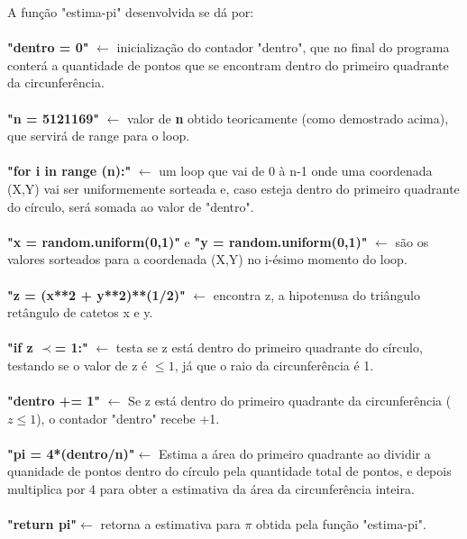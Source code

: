\documentclass{article}
\begin{document}
    A função "estima-pi" desenvolvida se dá por:\\
    \\
    \textbf{"dentro = 0"} $\leftarrow$ inicialização do contador "dentro", que no final do programa conterá a quantidade de pontos que se encontram dentro do primeiro quadrante da circunferência.\\
    \\
    \textbf{"n = 5121169"} $\leftarrow$ valor de \textbf{n} obtido teoricamente (como demostrado acima), que servirá de range para o loop.\\
    \\
    \textbf{"for i in range (n):"} $\leftarrow$ um loop que vai de 0 à n-1 onde uma coordenada (X,Y) vai ser uniformemente sorteada e, caso esteja dentro do primeiro quadrante do círculo, será somada ao valor de "dentro".\\
    \\
    \textbf{"x = random.uniform(0,1)"} e \textbf{"y = random.uniform(0,1)"} $\leftarrow$ são os valores sorteados para a coordenada (X,Y) no i-ésimo momento do loop.\\
    \\
    \textbf{"z = (x**2 + y**2)**(1/2)"} $\leftarrow$ encontra z, a hipotenusa do triângulo retângulo de catetos x e y.\\
    \\
    \textbf{"if z $\prec$= 1:"} $ \leftarrow$ testa se z está dentro do primeiro quadrante do círculo, testando se o valor de z é $\leq 1$, já que o raio da circunferência é 1.\\
    \\
    \textbf{"dentro += 1"} $\leftarrow$ Se z está dentro do primeiro quadrante da circunferência ($z\leq1$), o contador "dentro" recebe +1.\\
    \\
    \textbf{"pi = 4*(dentro/n)"}$\leftarrow$ Estima a área do primeiro quadrante ao dividir a quanidade de pontos dentro do círculo pela quantidade total de pontos, e depois multiplica por 4 para obter a estimativa da área da circunferência inteira.\\
    \\
    \textbf{"return pi"}$\leftarrow$ retorna a estimativa para $\pi$ obtida pela função "estima-pi".\\
    
\end{document}
